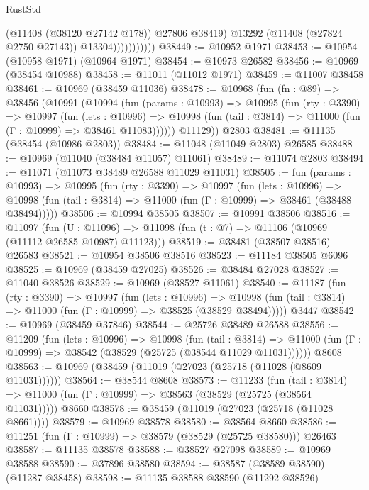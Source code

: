 \begin{lexlean}{RustStd}
\begin{coremodule}
                            (@11408 (@38120 @27142 @178))
                            @27806
                            @38419)
                          @13292
                          (@11408 (@27824 @2750 @27143))
                          @13304)))))))))))
@38449 := @10952 @1971
@38453 := @10954 (@10958 @1971) (@10964 @1971)
@38454 := @10973 @26582
@38456 := @10969 (@38454 @10988)
@38458 := @11011 (@11012 @1971)
@38459 := @11007 @38458
@38461 := @10969 (@38459 @11036)
@38478 := @10968
    (fun (fn : @89) =>
    @38456
      (@10991
        (@10994
          (fun (params : @10993) =>
          @10995
            (fun (rty : @3390) =>
            @10997
              (fun (lets : @10996) =>
              @10998 (fun (tail : @3814) => @11000 (fun (Γ : @10999) => @38461 @11083))))))
        @11129))
    @2803
@38481 := @11135 (@38454 (@10986 @2803))
@38484 := @11048 (@11049 @2803) @26585
@38488 := @10969 (@11040 (@38484 @11057) @11061)
@38489 := @11074 @2803
@38494 := @11071 (@11073 @38489 @26588 @11029 @11031)
@38505 := fun (params : @10993) =>
  @10995
    (fun (rty : @3390) =>
    @10997
      (fun (lets : @10996) =>
      @10998 (fun (tail : @3814) => @11000 (fun (Γ : @10999) => @38461 (@38488 @38494)))))
@38506 := @10994 @38505
@38507 := @10991 @38506
@38516 := @11097
    (fun (U : @11096) => @11098 (fun (t : @7) => @11106 (@10969 (@11112 @26585 @10987) @11123)))
@38519 := @38481 (@38507 @38516) @26583
@38521 := @10954 @38506 @38516
@38523 := @11184 @38505 @6096
@38525 := @10969 (@38459 @27025)
@38526 := @38484 @27028
@38527 := @11040 @38526
@38529 := @10969 (@38527 @11061)
@38540 := @11187
    (fun (rty : @3390) =>
    @10997
      (fun (lets : @10996) =>
      @10998 (fun (tail : @3814) => @11000 (fun (Γ : @10999) => @38525 (@38529 @38494)))))
    @3447
@38542 := @10969 (@38459 @37846)
@38544 := @25726 @38489 @26588
@38556 := @11209
    (fun (lets : @10996) =>
    @10998
      (fun (tail : @3814) =>
      @11000 (fun (Γ : @10999) => @38542 (@38529 (@25725 (@38544 @11029 @11031))))))
    @8608
@38563 := @10969 (@38459 (@11019 (@27023 (@25718 (@11028 (@8609 @11031))))))
@38564 := @38544 @8608
@38573 := @11233
    (fun (tail : @3814) => @11000 (fun (Γ : @10999) => @38563 (@38529 (@25725 (@38564 @11031)))))
    @8660
@38578 := @38459 (@11019 (@27023 (@25718 (@11028 @8661))))
@38579 := @10969 @38578
@38580 := @38564 @8660
@38586 := @11251 (fun (Γ : @10999) => @38579 (@38529 (@25725 @38580))) @26463
@38587 := @11135 @38578
@38588 := @38527 @27098
@38589 := @10969 @38588
@38590 := @37896 @38580
@38594 := @38587 (@38589 @38590) (@11287 @38458)
@38598 := @11135 @38588 @38590 (@11292 @38526)

\end{coremodule}
\end{lexlean}
